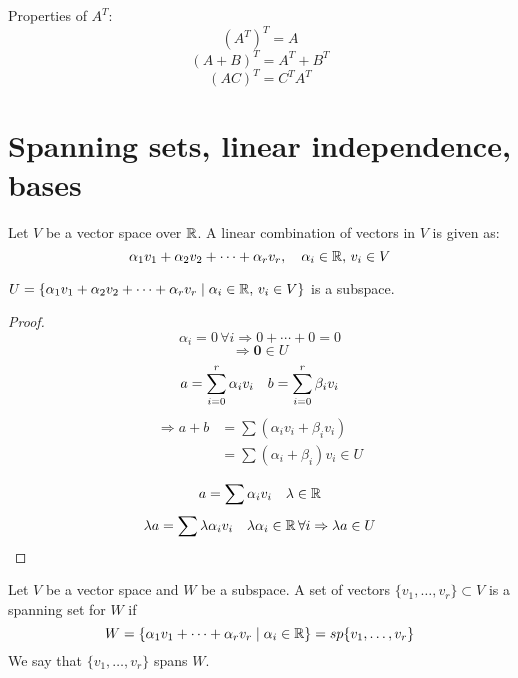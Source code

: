 \documentclass[a4paper,10pt]{article}
\begin{document}
Properties of $A^T$:
\[
	{(A^T)}^T = A
\]
\[
	{(A+B)}^T = A^T + B^T
\]
\[
	{(AC)}^T = C^T A^T
\]

\section{Spanning sets, linear independence, bases}

\begin{defn}
	Let $V$ be a vector space over $\mathbb{R}$. A linear combination of vectors in $V$ is given as:
	\[
		\alpha_1 v_1 + \alpha_2 v_2 + \cdots + \alpha_r v_r, \quad
		\alpha_i \in \mathbb{R}, \, v_i \in V
	\]
\end{defn}

\begin{prop}
	$U = \{
		\alpha_1 v_1 + \alpha_2 v_2 + \cdots + \alpha_r v_r \mid
		\alpha_i \in \mathbb{R}, \, v_i \in V
	\}$ is a subspace.
\end{prop}

\begin{proof}
	\[
		\alpha_i = 0 \, \forall i \Rightarrow 0 + \cdots + 0 = 0
	\]
	\[
		\Rightarrow \bm{0} \in U
	\]
	\[
		a = \sum_{i=0}^r \alpha_i v_i \quad
		b = \sum_{i=0}^r \beta_i v_i \\
	\]
	\begin{align*}
		\Rightarrow a + b &= \sum (\alpha_i v_i + \beta_i v_i) \\
		&= \sum (\alpha_i + \beta_i) v_i \in U
	\end{align*}

	\[
		a = \sum \alpha_i v_i \quad \lambda \in \mathbb{R}
	\]
	\[
		\lambda a = \sum \lambda \alpha_i v_i \quad
		\lambda \alpha_i \in \mathbb{R} \, \forall i
		\Rightarrow \lambda a \in U
	\]
\end{proof}

\begin{defn}
	Let $V$ be a vector space and $W$ be a subspace. A set of vectors
	$\{v_1, \ldots, v_r\} \subset V$ is a spanning set for $W$ if
	\[
		W =
		\{\alpha_1 v_1 + \cdots + \alpha_r v_r \mid \alpha_i \in \mathbb{R}\}
		= sp\{v_1, \ldots, v_r\}
	\]
	We say that $\{v_1, \ldots, v_r\}$ spans $W$.
\end{defn}
\end{document}
